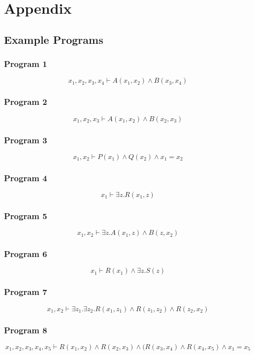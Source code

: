 \section{Appendix}

\subsection{Example Programs}

\subsubsection{Program 1}
$$x_1, x_2, x_3, x_4 \vdash A(x_1, x_2) \land B(x_3, x_4)$$

\subsubsection{Program 2}
$$x_1,x _2, x_3 \vdash A(x_1, x_2) \land B(x_2, x_3)$$

\subsubsection{Program 3}
$$x_1, x_2 \vdash P(x_1) \land Q(x_2) \land x_1 = x_2 $$

\subsubsection{Program 4}
$$x_1 \vdash \exists z.R(x_1,z)$$

\subsubsection{Program 5}
$$x_1,x_2 \vdash \exists z.A(x_1, z) \land B(z,x_2)$$

\subsubsection{Program 6}
$$x_1 \vdash R(x_1) \land \exists z.S(z)$$

\subsubsection{Program 7}
$$x_1, x_2 \vdash \exists z_1.\exists z_2.R(x_1, z_1) \land R(z_1, z_2) \land R(z_2, x_2)$$

\subsubsection{Program 8}
$$x_1, x_2, x_3, x_4, x_5 \vdash R(x_1, x_2) \land R(x_2, x_3) \land (R(x_3, x_4) \land R(x_4, x_5) \land x_1 = x_5$$


